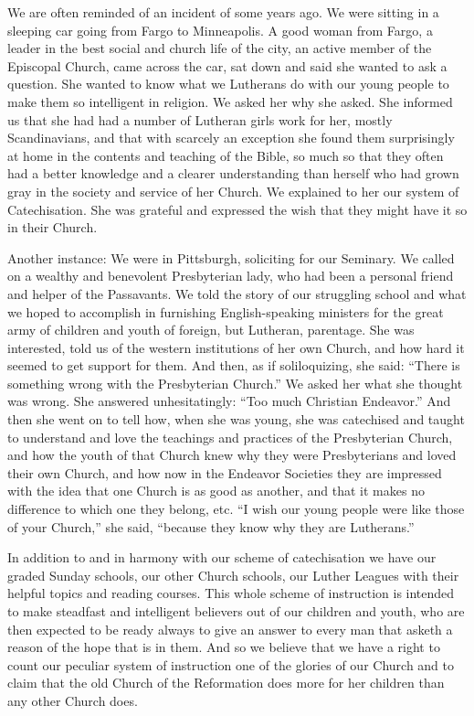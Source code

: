 We are often reminded of an incident of some years ago. We were sitting in a sleeping car going from Fargo to Minneapolis.  A good woman from Fargo, a leader in the best social and church life of the city, an active member of the Episcopal Church, came across the car, sat down and said she wanted to ask a question. She wanted to know what we Lutherans do with our young people to make them so intelligent in religion. We asked her why she asked. She informed us that she had had a number of Lutheran girls work for her, mostly Scandinavians, and that with scarcely an exception she found them surprisingly at home in the contents and teaching of the Bible, so much so that they often had a better knowledge and a clearer understanding than herself who had grown gray in the society and service of her Church. We explained to her our system of Catechisation. She was grateful and expressed the wish that they might have it so in their Church.

 Another instance: We were in Pittsburgh, soliciting for our Seminary. We called on a wealthy and benevolent Presbyterian lady, who had been a personal friend and helper of the Passavants. We told the story of our struggling school and what we hoped to accomplish in furnishing English-speaking ministers for the great army of children and youth
of foreign, but Lutheran, parentage. She was interested, told us of the western institutions of her own Church, and how hard it seemed to get support for them. And then, as if soliloquizing, she said: “There is something wrong with the Presbyterian Church.” We asked her what she thought was wrong. She answered unhesitatingly: “Too much Christian Endeavor.” And then she went on to tell how, when she was young, she was catechised and taught to understand and love the teachings and practices of the Presbyterian Church, and how the youth of that Church knew why they were Presbyterians and loved their own Church, and how now in the Endeavor Societies they are impressed with the idea that one Church is as good as another, and that it makes no difference to which one they belong, etc. “I wish our young people were like those of your Church,” she said, “because they know why they are Lutherans.”

In addition to and in harmony with our scheme of catechisation we have our graded Sunday schools, our other Church schools, our Luther Leagues with their helpful topics and reading courses. This whole scheme of instruction is intended to make steadfast and intelligent believers out of our children and youth, who are then expected to be ready always to give an answer to every man that asketh a reason of the hope that is in them. And so we
believe that we have a right to count our peculiar system of instruction one of the glories of our Church and to claim that the old Church of the Reformation does more for her children than any other Church does.

